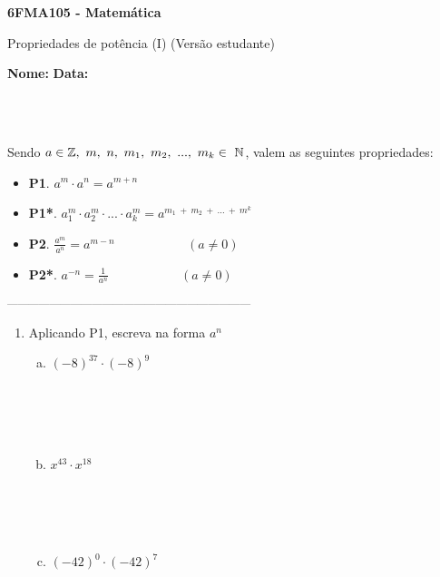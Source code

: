 \documentclass[a4paper,14pt]{article}
\begin{document}
	
	\noindent\textbf{6FMA105 - Matemática} 
	
	\begin{center}Propriedades de potência (I) (Versão estudante)
	\end{center}
	
	\noindent\textbf{Nome:} \underline{\hspace{10cm}}
	\noindent\textbf{Data:} \underline{\hspace{4cm}}
	
	~ \\ ~
	\begin{multicols}{2}
		\noindent Sendo $a \in \mathbb{Z},~m,~n,~m_1,~m_2,~...,~m_k~ \\ \in~\mathbb{N}$, valem as seguintes propriedades: \\
		\begin{itemize}
			\item \textbf{P1}. $a^m \cdot a^n = a^{m + n}$
			\item \textbf{P1*}. $a^m_1 \cdot a^m_2 \cdot ... \cdot a^m_k = a^{m_1~+~m_2~+~...~+~m^k}$
			\item \textbf{P2}. $\frac{a^m}{a^n} = a^{m - n}$ ~~~~~~~~~~ $(a \neq 0)$
			\item \textbf{P2*}. $a^{-n} = \frac{1}{a^n}$ ~~~~~~~~~~ $(a \neq 0)$
		\end{itemize}
	\textsubscript{---------------------------------------------------------------------}
    	\begin{enumerate}
    		\item Aplicando P1, escreva na forma $a^n$
    		\begin{enumerate}[a)]
    			\item $(-8)^{37} \cdot (-8)^9$ \\\\\\\\\\
    			\item $x^43 \cdot x^18$ \\\\\\\\\\
    			\item $(-42)^0 \cdot (-42)^7$ \\\\

\end{enumerate}
\end{enumerate}
\end{multicols}
\end{document}
